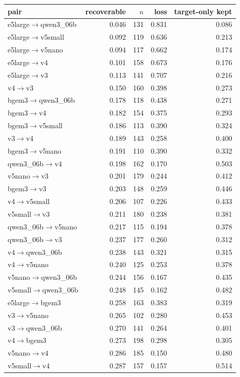 \begin{tabular}{lrrrr}
\toprule
pair & recoverable & $n$ & loss & target-only kept \\
\midrule
e5large$\to$qwen3\_06b & 0.046 & 131 & 0.831 & 0.086 \\
e5large$\to$v5small & 0.092 & 119 & 0.636 & 0.213 \\
e5large$\to$v5nano & 0.094 & 117 & 0.662 & 0.174 \\
e5large$\to$v4 & 0.101 & 158 & 0.673 & 0.176 \\
e5large$\to$v3 & 0.113 & 141 & 0.707 & 0.216 \\
v4$\to$v3 & 0.150 & 160 & 0.398 & 0.273 \\
bgem3$\to$qwen3\_06b & 0.178 & 118 & 0.438 & 0.271 \\
bgem3$\to$v4 & 0.182 & 154 & 0.375 & 0.293 \\
bgem3$\to$v5small & 0.186 & 113 & 0.390 & 0.324 \\
v3$\to$v4 & 0.189 & 143 & 0.258 & 0.400 \\
bgem3$\to$v5nano & 0.191 & 110 & 0.390 & 0.332 \\
qwen3\_06b$\to$v4 & 0.198 & 162 & 0.170 & 0.503 \\
v5nano$\to$v3 & 0.201 & 179 & 0.244 & 0.412 \\
bgem3$\to$v3 & 0.203 & 148 & 0.259 & 0.446 \\
v4$\to$v5small & 0.206 & 107 & 0.226 & 0.433 \\
v5small$\to$v3 & 0.211 & 180 & 0.238 & 0.381 \\
qwen3\_06b$\to$v5nano & 0.217 & 115 & 0.194 & 0.378 \\
qwen3\_06b$\to$v3 & 0.237 & 177 & 0.260 & 0.312 \\
v4$\to$qwen3\_06b & 0.238 & 143 & 0.321 & 0.315 \\
v4$\to$v5nano & 0.240 & 125 & 0.253 & 0.378 \\
v5nano$\to$qwen3\_06b & 0.244 & 156 & 0.167 & 0.435 \\
v5small$\to$qwen3\_06b & 0.248 & 145 & 0.162 & 0.482 \\
e5large$\to$bgem3 & 0.258 & 163 & 0.383 & 0.319 \\
v3$\to$v5nano & 0.265 & 102 & 0.280 & 0.453 \\
v3$\to$qwen3\_06b & 0.270 & 141 & 0.264 & 0.401 \\
v4$\to$bgem3 & 0.273 & 198 & 0.298 & 0.305 \\
v5nano$\to$v4 & 0.286 & 185 & 0.150 & 0.480 \\
v5small$\to$v4 & 0.287 & 157 & 0.157 & 0.514 \\

\end{tabular}
